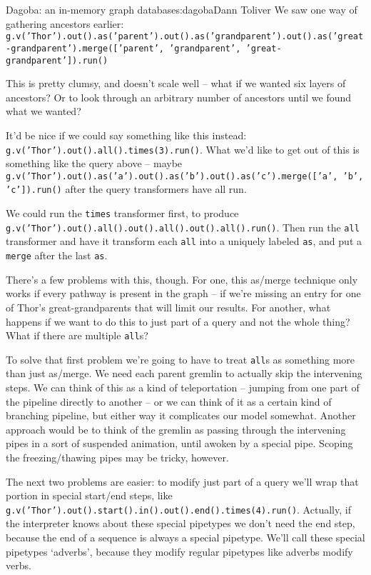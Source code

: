 \begin{aosachapter}{Dagoba: an in-memory graph database}{s:dagoba}{Dann Toliver}
We saw one way of gathering ancestors earlier:
\texttt{g.v('Thor').out().as('parent').out().as('grandparent').out().as('great-grandparent').merge({[}'parent', 'grandparent', 'great-grandparent'{]}).run()}

This is pretty clumsy, and doesn't scale well -- what if we wanted six
layers of ancestors? Or to look through an arbitrary number of ancestors
until we found what we wanted?

It'd be nice if we could say something like this instead:
\texttt{g.v('Thor').out().all().times(3).run()}. What we'd like to get
out of this is something like the query above -- maybe
\texttt{g.v('Thor').out().as('a').out().as('b').out().as('c').merge({[}'a', 'b', 'c'{]}).run()}
after the query transformers have all run.

We could run the \texttt{times} transformer first, to produce
\texttt{g.v('Thor').out().all().out().all().out().all().run()}. Then run
the \texttt{all} transformer and have it transform each \texttt{all}
into a uniquely labeled \texttt{as}, and put a \texttt{merge} after the
last \texttt{as}.

There's a few problems with this, though. For one, this as/merge
technique only works if every pathway is present in the graph -- if
we're missing an entry for one of Thor's great-grandparents that will
limit our results. For another, what happens if we want to do this to
just part of a query and not the whole thing? What if there are multiple
\texttt{all}s?

To solve that first problem we're going to have to treat \texttt{all}s
as something more than just as/merge. We need each parent gremlin to
actually skip the intervening steps. We can think of this as a kind of
teleportation -- jumping from one part of the pipeline directly to
another -- or we can think of it as a certain kind of branching
pipeline, but either way it complicates our model somewhat. Another
approach would be to think of the gremlin as passing through the
intervening pipes in a sort of suspended animation, until awoken by a
special pipe. Scoping the freezing/thawing pipes may be tricky, however.

The next two problems are easier: to modify just part of a query we'll
wrap that portion in special start/end steps, like
\texttt{g.v('Thor').out().start().in().out().end().times(4).run()}.
Actually, if the interpreter knows about these special pipetypes we
don't need the end step, because the end of a sequence is always a
special pipetype. We'll call these special pipetypes `adverbs', because
they modify regular pipetypes like adverbs modify verbs.


\end{aosachapter}
